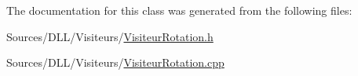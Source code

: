 The documentation for this class was generated from the following files\+:\begin{DoxyCompactItemize}
\item 
Sources/\+D\+L\+L/\+Visiteurs/\hyperlink{_visiteur_rotation_8h}{Visiteur\+Rotation.\+h}\item 
Sources/\+D\+L\+L/\+Visiteurs/\hyperlink{_visiteur_rotation_8cpp}{Visiteur\+Rotation.\+cpp}\end{DoxyCompactItemize}
